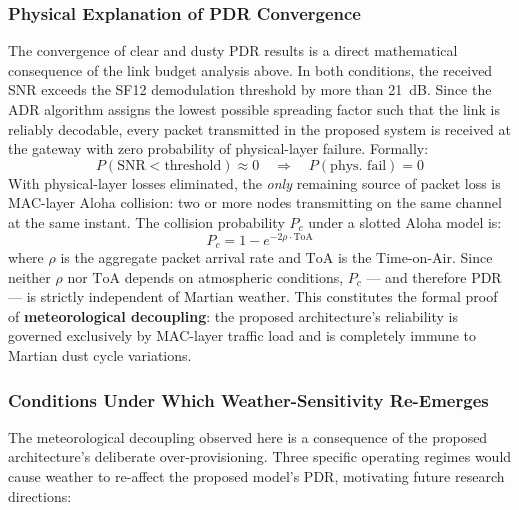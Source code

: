 \documentclass[journal,10pt,doublecolumn]{IEEEtran}
\begin{document}
\subsubsection{Physical Explanation of PDR Convergence}
The convergence of clear and dusty PDR results is a direct mathematical consequence of the link budget analysis above. In both conditions, the received SNR exceeds the SF12 demodulation threshold by more than 21~dB. Since the ADR algorithm assigns the lowest possible spreading factor such that the link is reliably decodable, every packet transmitted in the proposed system is received at the gateway with zero probability of physical-layer failure. Formally:
\begin{equation}
    P(\text{SNR} < \text{threshold}) \approx 0 \quad \Rightarrow \quad P(\text{phys.\ fail}) = 0
\end{equation}
With physical-layer losses eliminated, the \emph{only} remaining source of packet loss is MAC-layer Aloha collision: two or more nodes transmitting on the same channel at the same instant. The collision probability $P_c$ under a slotted Aloha model is:
\begin{equation}
    P_c = 1 - e^{-2\rho \cdot \text{ToA}}
\end{equation}
where $\rho$ is the aggregate packet arrival rate and $\text{ToA}$ is the Time-on-Air. Since neither $\rho$ nor $\text{ToA}$ depends on atmospheric conditions, $P_c$ --- and therefore PDR --- is strictly independent of Martian weather. This constitutes the formal proof of \textbf{meteorological decoupling}: the proposed architecture's reliability is governed exclusively by MAC-layer traffic load and is completely immune to Martian dust cycle variations.

\subsubsection{Conditions Under Which Weather-Sensitivity Re-Emerges}
\label{subsubsec:future_sensitivity}
The meteorological decoupling observed here is a consequence of the proposed architecture's deliberate over-provisioning. Three specific operating regimes would cause weather to re-affect the proposed model's PDR, motivating future research directions:
\end{document}

